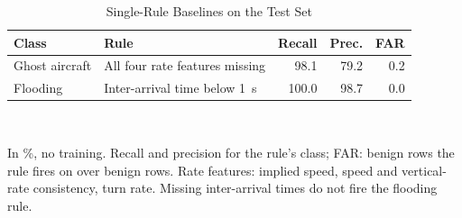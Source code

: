 \begin{table}[t]
\centering
\footnotesize
\caption{Single-Rule Baselines on the Test Set}
\label{tab:rules}
\setlength{\tabcolsep}{3pt}
\begin{tabularx}{\columnwidth}{@{}l>{\raggedright\arraybackslash}Xrrr@{}}
\toprule
Class & Rule & Recall & Prec. & FAR \\
\midrule
Ghost aircraft & All four rate features missing & 98.1 & 79.2 & 0.2 \\
Flooding & Inter-arrival time below 1~s & 100.0 & 98.7 & 0.0 \\
\bottomrule
\end{tabularx}
\\[2pt]
\parbox{\linewidth}{\scriptsize In \%, no training. Recall and precision for the rule's class; FAR: benign rows the rule fires on over benign rows. Rate features: implied speed, speed and vertical-rate consistency, turn rate. Missing inter-arrival times do not fire the flooding rule.}
\end{table}
